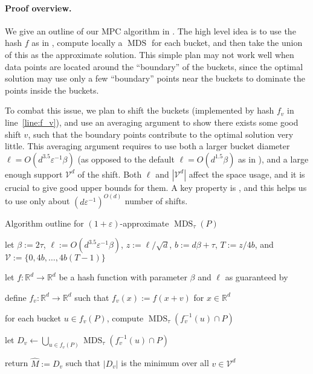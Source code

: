 \documentclass[11pt,letterpaper]{article}
\theoremstyle{plain}
\theoremstyle{definition}
\theoremstyle{remark}
\DeclareMathOperator{\MDS}{MDS}
\renewcommand{\epsilon}{\ensuremath{\varepsilon}}
\let\epsilon\varepsilon
\begin{document}
\paragraph{Proof overview.}
We give an outline of our MPC algorithm in . 
The high level idea is to use the hash $f$ as in ,
compute locally a $\MDS$ for each bucket, and then take the union of this as the approximate solution.
This simple plan may not work well when data points are located around the ``boundary'' of the buckets,
since the optimal solution may use only a few ``boundary'' points near the buckets to dominate the points inside the buckets.

To combat this issue, we plan to shift the buckets (implemented by hash $f_v$ in line~\ref{line:f_v}),
and use an averaging argument to show there exists some good shift $v$,
such that the boundary points contribute to the optimal solution very little.
This averaging argument requires to use both a larger bucket diameter
$\ell = O(d^{3.5}\epsilon^{-1} \beta)$ (as opposed to the default $\ell = O(d^{1.5} \beta)$ as in ),
and a large enough support $\mathcal{V}^d$ of the shift.
Both $\ell$ and $|\mathcal{V}^d|$ affect the space usage, and it is crucial to give good upper bounds for them.
A key property is , and this helps us to use only about $(d\epsilon^{-1})^{O(d)}$ number of shifts.



 

\begin{algorithm}[ht]
    \caption{Algorithm outline for $(1 + \epsilon)$-approximate $\MDS_{\tau}(P)$}
    \label{alg:imp_approx_mds}
    \begin{algorithmic}[1]
        \State let $\beta:= 2\tau$, $\ell:= O(d^{3.5}\varepsilon^{-1}\beta)$, $z:= \ell/\sqrt{d}$, $b:= d\beta+\tau$, $T:= z/4b$, and $\mathcal{V} := \{ 0, 4b, \ldots, 4b(T-1) \}$
        \label{line:parameters}
       
        \State let $f: \mathbb{R}^{d}\to \mathbb{R}^{d}$ be a hash function with parameter $\beta$  and $\ell$ as guaranteed by  

        \label{line:f}

        \label{line:for-loop}
        
        \State define $f_v : \mathbb{R}^d \to \mathbb{R}^d$ such that $f_{v}(x):= f(x + v)$ for $x \in \mathbb{R}^d$
        \label{line:f_v}
         
        \State for each bucket $u\in f_{v}(P)$, compute $\MDS_{\tau}(f_{v}^{-1}(u)\cap P)$
        \label{line:mds_bucket}
            
        \State let $D_{v}\gets \bigcup_{u\in f_{v}(P)} \MDS_{\tau}(f_{v}^{-1}(u)\cap P)$
        \label{line:mds_aggregate}


        \EndFor
        \State return $\widehat{M} := D_{v}$ such that $|D_{v}|$ is the minimum over all $v \in \mathcal{V}^d$
        \label{line:return}
           
    \end{algorithmic}
\end{algorithm}
\end{document}
